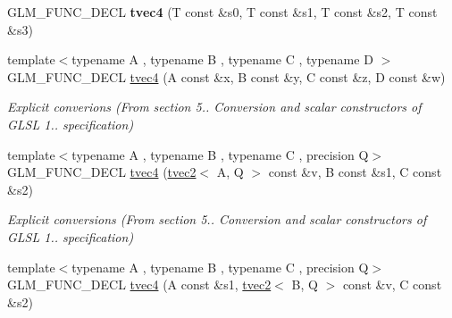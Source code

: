 \begin{DoxyCompactItemize}
\item 
G\+L\+M\+\_\+\+F\+U\+N\+C\+\_\+\+D\+E\+CL {\bfseries tvec4} (T const \&s0, T const \&s1, T const \&s2, T const \&s3)\hypertarget{structglm_1_1detail_1_1tvec4_a7b81815685a8d9e0fbdd9b660750ef26}{}\label{structglm_1_1detail_1_1tvec4_a7b81815685a8d9e0fbdd9b660750ef26}

\item 
{\footnotesize template$<$typename A , typename B , typename C , typename D $>$ }\\G\+L\+M\+\_\+\+F\+U\+N\+C\+\_\+\+D\+E\+CL \hyperlink{structglm_1_1detail_1_1tvec4_aa19075717a5439da09d279cc4b2b9a73}{tvec4} (A const \&x, B const \&y, C const \&z, D const \&w)\hypertarget{structglm_1_1detail_1_1tvec4_aa19075717a5439da09d279cc4b2b9a73}{}\label{structglm_1_1detail_1_1tvec4_aa19075717a5439da09d279cc4b2b9a73}

\begin{DoxyCompactList}\small\item\em Explicit converions (From section 5.. Conversion and scalar constructors of G\+L\+SL 1.. specification) \end{DoxyCompactList}\item 
{\footnotesize template$<$typename A , typename B , typename C , precision Q$>$ }\\G\+L\+M\+\_\+\+F\+U\+N\+C\+\_\+\+D\+E\+CL \hyperlink{structglm_1_1detail_1_1tvec4_a5fa780e942ec21ec77ec2fe9d8f57cf3}{tvec4} (\hyperlink{structglm_1_1detail_1_1tvec2}{tvec2}$<$ A, Q $>$ const \&v, B const \&s1, C const \&s2)\hypertarget{structglm_1_1detail_1_1tvec4_a5fa780e942ec21ec77ec2fe9d8f57cf3}{}\label{structglm_1_1detail_1_1tvec4_a5fa780e942ec21ec77ec2fe9d8f57cf3}

\begin{DoxyCompactList}\small\item\em Explicit conversions (From section 5.. Conversion and scalar constructors of G\+L\+SL 1.. specification) \end{DoxyCompactList}\item 
{\footnotesize template$<$typename A , typename B , typename C , precision Q$>$ }\\G\+L\+M\+\_\+\+F\+U\+N\+C\+\_\+\+D\+E\+CL \hyperlink{structglm_1_1detail_1_1tvec4_ad3de2f66c42e8d6c46d9f85abef13ea2}{tvec4} (A const \&s1, \hyperlink{structglm_1_1detail_1_1tvec2}{tvec2}$<$ B, Q $>$ const \&v, C const \&s2)\hypertarget{structglm_1_1detail_1_1tvec4_ad3de2f66c42e8d6c46d9f85abef13ea2}{}\label{structglm_1_1detail_1_1tvec4_ad3de2f66c42e8d6c46d9f85abef13ea2}


\end{DoxyCompactItemize}
